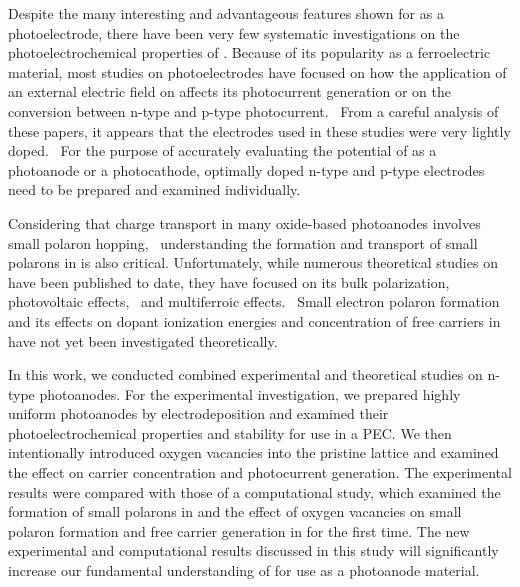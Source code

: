 Despite the many interesting and advantageous features shown for  as a photoelectrode, there have been very few systematic investigations on the photoelectrochemical properties of . Because of its popularity as a ferroelectric material, most studies on  photoelectrodes have focused on how the application of an external electric field on  affects its photocurrent generation or on the conversion between n-type and p-type photocurrent.~\cite{song2018domain,liu2016enhanced,cao2014switchable,huang2016tunable} From a careful analysis of these papers, it appears that the  electrodes used in these studies were very lightly doped.~\cite{lee2019progress} For the purpose of accurately evaluating the potential of  as a photoanode or a photocathode, optimally doped n-type and p-type  electrodes need to be prepared and examined individually.

Considering that charge transport in many oxide-based photoanodes involves small polaron hopping,~\cite{wheeler2019combined,smart2019optical,smart2018mechanistic,smart2017effect,seo2018role,kim2015simultaneous} understanding the formation and transport of small polarons in  is also critical. Unfortunately, while numerous theoretical studies on  have been published to date, they have focused on its bulk polarization,~\cite{kan2011chemical,neaton2005first} photovoltaic effects,~\cite{young2012first,liu2013development} and multiferroic effects.~\cite{wang2012atomistic,chang2016prediction} Small electron polaron formation and its effects on dopant ionization energies and concentration of free carriers in  have not yet been investigated theoretically.

In this work, we conducted combined experimental and theoretical studies on n-type  photoanodes. For the experimental investigation, we prepared highly uniform  photoanodes by electrodeposition and examined their photoelectrochemical properties and stability for use in a PEC. We then intentionally introduced oxygen vacancies into the pristine  lattice and examined the effect on carrier concentration and photocurrent generation. The experimental results were compared with those of a computational study, which examined the formation of small polarons in  and the effect of oxygen vacancies on small polaron formation and free carrier generation in  for the first time. The new experimental and computational results discussed in this study will significantly increase our fundamental understanding of  for use as a photoanode material.


